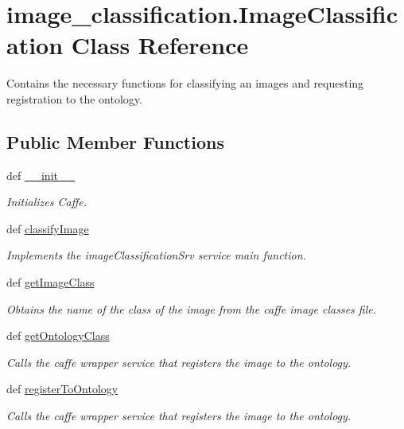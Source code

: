 \hypertarget{classimage__classification_1_1ImageClassification}{\section{image\-\_\-classification.\-Image\-Classification Class Reference}
\label{classimage__classification_1_1ImageClassification}
}


Contains the necessary functions for classifying an images and requesting registration to the ontology.  


\subsection*{Public Member Functions}
\begin{DoxyCompactItemize}
\item 
def \hyperlink{classimage__classification_1_1ImageClassification_aa8387fa530b991c247c07fb8e31659d7}{\-\_\-\-\_\-init\-\_\-\-\_\-}
\begin{DoxyCompactList}\small\item\em Initializes Caffe. \end{DoxyCompactList}\item 
def \hyperlink{classimage__classification_1_1ImageClassification_a57a1c2a4c20c67a075e6750766b9ae47}{classify\-Image}
\begin{DoxyCompactList}\small\item\em Implements the image\-Classification\-Srv service main function. \end{DoxyCompactList}\item 
def \hyperlink{classimage__classification_1_1ImageClassification_a58d81fee571b013e4c42ff5f6b8e0f5b}{get\-Image\-Class}
\begin{DoxyCompactList}\small\item\em Obtains the name of the class of the image from the caffe image classes file. \end{DoxyCompactList}\item 
def \hyperlink{classimage__classification_1_1ImageClassification_a4423a4e0acac8e6100d0a35076411298}{get\-Ontology\-Class}
\begin{DoxyCompactList}\small\item\em Calls the caffe wrapper service that registers the image to the ontology. \end{DoxyCompactList}\item 
def \hyperlink{classimage__classification_1_1ImageClassification_ac8388da7f4188348ea700e2fb3b51bcc}{register\-To\-Ontology}
\begin{DoxyCompactList}\small\item\em Calls the caffe wrapper service that registers the image to the ontology. \end{DoxyCompactList}\end{DoxyCompactItemize}
